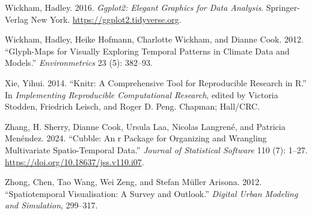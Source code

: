 \begin{CSLReferences}{1}{0}
\leavevmode{}%
Wickham, Hadley. 2016. \emph{Ggplot2: Elegant Graphics for Data Analysis}. Springer-Verlag New York. \url{https://ggplot2.tidyverse.org}.

\leavevmode{}%
Wickham, Hadley, Heike Hofmann, Charlotte Wickham, and Dianne Cook. 2012. {``Glyph-Maps for Visually Exploring Temporal Patterns in Climate Data and Models.''} \emph{Environmetrics} 23 (5): 382--93.

\leavevmode{}%
Xie, Yihui. 2014. {``Knitr: A Comprehensive Tool for Reproducible Research in {R}.''} In \emph{Implementing Reproducible Computational Research}, edited by Victoria Stodden, Friedrich Leisch, and Roger D. Peng. Chapman; Hall/CRC.

\leavevmode{}%
Zhang, H. Sherry, Dianne Cook, Ursula Laa, Nicolas Langrené, and Patricia Menéndez. 2024. {``Cubble: An r Package for Organizing and Wrangling Multivariate Spatio-Temporal Data.''} \emph{Journal of Statistical Software} 110 (7): 1--27. \url{https://doi.org/10.18637/jss.v110.i07}.

\leavevmode{}%
Zhong, Chen, Tao Wang, Wei Zeng, and Stefan Müller Arisona. 2012. {``Spatiotemporal Visualisation: A Survey and Outlook.''} \emph{Digital Urban Modeling and Simulation}, 299--317.

\end{CSLReferences}


\address{%
Maliny Po\\
Monash University\\%
Department of Econometrics and Business Statistics\\ Melbourne, Australia\\
%
%
\textit{ORCiD: \href{https://orcid.org/0009-0008-4686-6631}{0009-0008-4686-6631}}\\%
\href{mailto:malinypo12@gmail.com}{\nolinkurl{malinypo12@gmail.com}}%
}

\address{%
S. Nathan Yang\\
Duke University\\%
Durham, North Carolina\\
%
%
\textit{ORCiD: \href{https://orcid.org/0009-0002-9985-1042}{0009-0002-9985-1042}}\\%
\href{mailto:nathan.s.yang@gmail.com}{\nolinkurl{nathan.s.yang@gmail.com}}%
}

